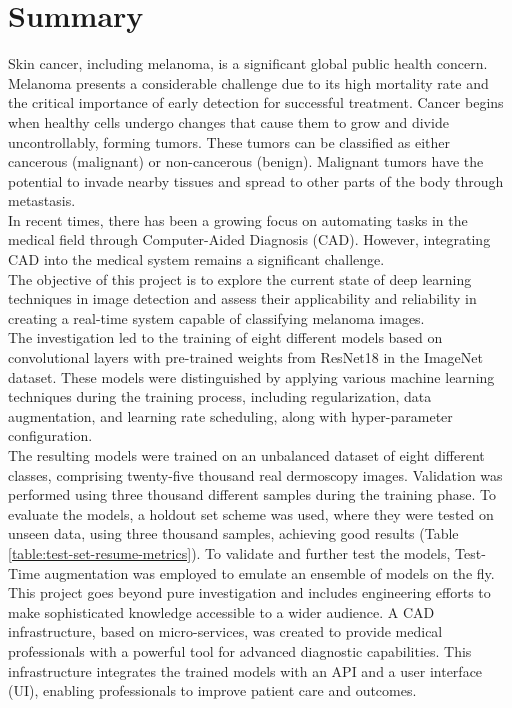 \chapter*{Summary}

Skin cancer, including melanoma, is a significant global public health concern.
Melanoma presents a considerable challenge due to its high mortality rate and
the critical importance of early detection for successful treatment. Cancer
begins when healthy cells undergo changes that cause them to grow and divide
uncontrollably, forming tumors. These tumors can be classified as either
cancerous (malignant) or non-cancerous (benign). Malignant tumors have the
potential to invade nearby tissues and spread to other parts of the body
through metastasis. \\

In recent times, there has been a growing focus on automating tasks in the
medical field through Computer-Aided Diagnosis (CAD). However, integrating CAD
into the medical system remains a significant challenge. \\

The objective of this project is to explore the current state of deep learning
techniques in image detection and assess their applicability and reliability in
creating a real-time system capable of classifying melanoma images. \\

The investigation led to the training of eight different models based on
convolutional layers with pre-trained weights from ResNet18 in the ImageNet
dataset. These models were distinguished by applying various machine learning
techniques during the training process, including regularization, data
augmentation, and learning rate scheduling, along with hyper-parameter
configuration. \\

The resulting models were trained on an unbalanced dataset of eight different
classes, comprising twenty-five thousand real dermoscopy images. Validation was
performed using three thousand different samples during the training phase. To
evaluate the models, a holdout set scheme was used, where they were tested on
unseen data, using three thousand samples, achieving good results (Table
\ref{table:test-set-resume-metrics}). To validate and further test the models,
Test-Time augmentation was employed to emulate an ensemble of models on the
fly. \\

This project goes beyond pure investigation and includes engineering efforts to
make sophisticated knowledge accessible to a wider audience. A CAD
infrastructure, based on micro-services, was created to provide medical
professionals with a powerful tool for advanced diagnostic capabilities. This
infrastructure integrates the trained models with an API and a user interface
(UI), enabling professionals to improve patient care and outcomes. \\


